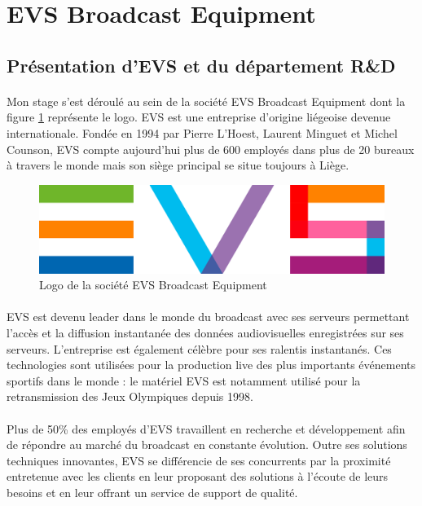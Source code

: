\documentclass{article}
\begin{document}
    \newpage
    \section{EVS Broadcast Equipment}
    \subsection{Présentation d'EVS et du département R\&D}
    \paragraph{}
    Mon stage s'est déroulé au sein de la société EVS Broadcast Equipment dont la figure \ref{fig:logo} représente le logo. EVS est une entreprise d'origine liégeoise devenue internationale. Fondée en 1994 par Pierre L'Hoest, Laurent Minguet et Michel Counson, EVS compte aujourd'hui plus de 600 employés dans plus de 20 bureaux à travers le monde mais son siège principal se situe toujours à Liège.

    \begin{figure}[H]
        \centering
        \includegraphics[width=.5\linewidth]{./images/EVS-logo.png}
        \caption{Logo de la société EVS Broadcast Equipment\cite{EVS:website}}
        \label{fig:logo}
    \end{figure}

    \paragraph{}
    EVS est devenu leader dans le monde du broadcast avec ses serveurs permettant l'accès et la diffusion instantanée des données audiovisuelles enregistrées sur ses serveurs. L'entreprise est également célèbre pour ses ralentis instantanés. Ces technologies sont utilisées pour la production live des plus importants événements sportifs dans le monde : le matériel EVS est notamment utilisé pour la retransmission des Jeux Olympiques depuis 1998.

    \paragraph{}
    Plus de 50\% des employés d'EVS travaillent en recherche et développement afin de répondre au marché du broadcast en constante évolution. Outre ses solutions techniques innovantes, EVS se différencie de ses concurrents par la proximité entretenue avec les clients en leur proposant des solutions à l'écoute de leurs besoins et en leur offrant un service de support de qualité.
\end{document}
